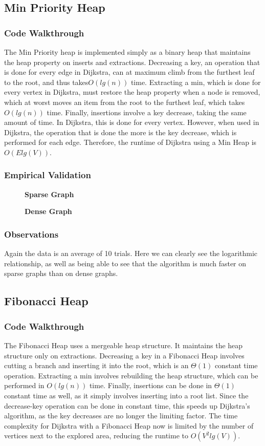 \documentclass[a4paper,12pt]{article}
\begin{document}
\subsection{Min Priority Heap}
\subsubsection{Code Walkthrough}
The Min Priority heap is implemented simply as a binary heap that maintains the heap
property on inserts and extractions. Decreasing a key, an operation that is done for every edge in Dijkstra, can at maximum climb from the furthest leaf to the root, and thus takes$O(lg(n))$ time. Extracting a min, which is done for every vertex in Dijkstra, must restore the heap property when a node is removed, which at worst moves an item from the root to the furthest leaf, which takes $O(lg(n))$ time. Finally, insertions involve a key decrease, taking the same amount of time. In Dijkstra, this is done for every vertex. However, when used in Dijkstra, the operation that is done the more is the key decrease, which is performed for each edge. Therefore, the runtime of Dijkstra using a Min Heap is $O(Elg(V))$.
\subsubsection{Empirical Validation}
\begin{figure}[H]
  \centering
  \textbf{Sparse Graph}\par\medskip
\end{figure}
\begin{figure}[H]
  \centering
  \textbf{Dense Graph}\par\medskip
\end{figure}
\subsubsection{Observations}
Again the data is an average of 10 trials. Here we can clearly see the logarithmic relationship, as well as being able to see that the algorithm is much faster on sparse graphs than on dense graphs.
\subsection{Fibonacci Heap}
\subsubsection{Code Walkthrough}
The Fibonacci Heap uses a mergeable heap structure. It maintains the heap structure only on extractions. Decreasing a key in a Fibonacci Heap involves cutting a branch and inserting it into the root, which is an $\Theta(1)$ constant time operation. Extracting a min involves rebuilding the heap structure, which can be performed in $O(lg(n))$ time. Finally, insertions can be done in $\Theta(1)$ constant time as well, as it simply involves inserting into a root list. Since the decrease-key operation can be done in constant time, this speeds up Dijkstra's algorithm, as the key decreases are no longer the limiting factor. The time complexity for Dijkstra with a Fibonacci Heap now is limited by the number of vertices next to the explored area, reducing the runtime to $O(V^2lg(V))$.
\end{document}
